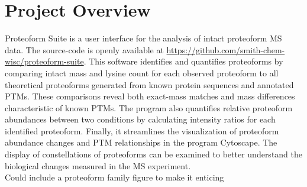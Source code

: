 


\section*{Project Overview}

Proteoform Suite is a user interface for the analysis of intact proteoform MS data. The source-code is openly available at \url{https://github.com/smith-chem-wisc/proteoform-suite}. This software identifies and quantifies proteoforms by comparing intact mass and lysine count for each observed proteoform to all theoretical proteoforms generated from known protein sequences and annotated PTMs. These comparisons reveal both exact-mass matches and mass differences characteristic of known PTMs. The program also quantifies relative proteoform abundances between two conditions by calculating intensity ratios for each identified proteoform. Finally, it streamlines the visualization of proteoform abundance changes and PTM relationships in the program Cytoscape. The display of constellations of proteoforms can be examined to better understand the biological changes measured in the MS experiment.
\\

Could include a proteoform family figure to make it enticing